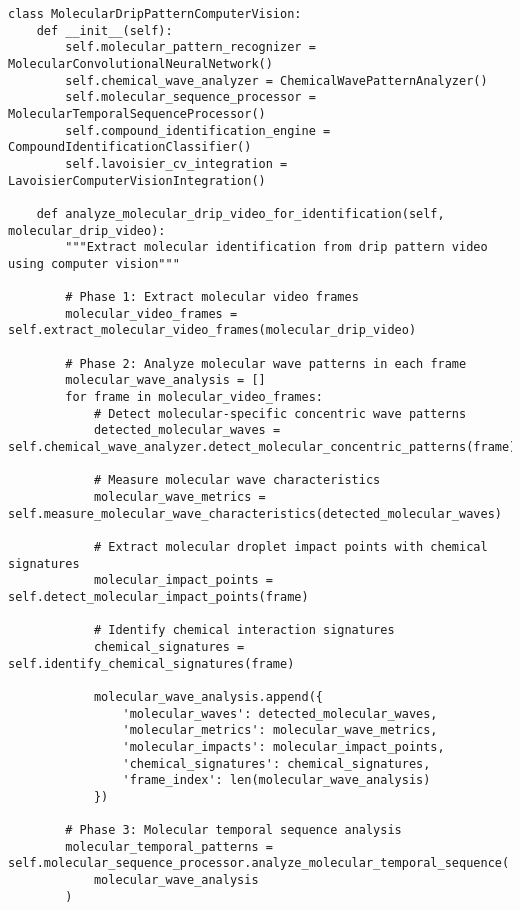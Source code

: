 \documentclass[12pt,a4paper]{article}
\begin{document}
\begin{lstlisting}[style=pythonstyle, caption=Computer Vision Molecular Pattern Analysis]
class MolecularDripPatternComputerVision:
    def __init__(self):
        self.molecular_pattern_recognizer = MolecularConvolutionalNeuralNetwork()
        self.chemical_wave_analyzer = ChemicalWavePatternAnalyzer()
        self.molecular_sequence_processor = MolecularTemporalSequenceProcessor()
        self.compound_identification_engine = CompoundIdentificationClassifier()
        self.lavoisier_cv_integration = LavoisierComputerVisionIntegration()
        
    def analyze_molecular_drip_video_for_identification(self, molecular_drip_video):
        """Extract molecular identification from drip pattern video using computer vision"""
        
        # Phase 1: Extract molecular video frames
        molecular_video_frames = self.extract_molecular_video_frames(molecular_drip_video)
        
        # Phase 2: Analyze molecular wave patterns in each frame
        molecular_wave_analysis = []
        for frame in molecular_video_frames:
            # Detect molecular-specific concentric wave patterns
            detected_molecular_waves = self.chemical_wave_analyzer.detect_molecular_concentric_patterns(frame)
            
            # Measure molecular wave characteristics
            molecular_wave_metrics = self.measure_molecular_wave_characteristics(detected_molecular_waves)
            
            # Extract molecular droplet impact points with chemical signatures
            molecular_impact_points = self.detect_molecular_impact_points(frame)
            
            # Identify chemical interaction signatures
            chemical_signatures = self.identify_chemical_signatures(frame)
            
            molecular_wave_analysis.append({
                'molecular_waves': detected_molecular_waves,
                'molecular_metrics': molecular_wave_metrics,
                'molecular_impacts': molecular_impact_points,
                'chemical_signatures': chemical_signatures,
                'frame_index': len(molecular_wave_analysis)
            })
        
        # Phase 3: Molecular temporal sequence analysis
        molecular_temporal_patterns = self.molecular_sequence_processor.analyze_molecular_temporal_sequence(
            molecular_wave_analysis
        )
        

\end{lstlisting}
\end{document}
